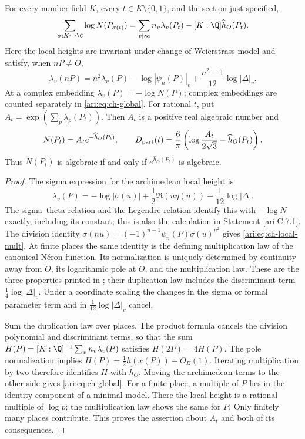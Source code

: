 \begin{proposition}\label{ari:C.6.1}
For every number field $K$, every $t\in K\setminus\{0,1\}$,
and the section just specified,
\begin{equation}\label{ari:eq:ch-global}
 \sum_{\sigma:K\hookrightarrow\C}\log N(P_{\sigma(t)})
 =\sum_{v\nmid\infty}n_v\lambda_v(P_t)
          -[K:\Q]\widehat h_O(P_t).
\end{equation}
Here the local heights are invariant under change of Weierstrass
model and satisfy, when $nP\ne O$,
\begin{equation}\label{ari:eq:ch-local-mult}
 \lambda_v(nP)=n^2\lambda_v(P)-\log|\psi_n(P)|_v
                   +\frac{n^2-1}{12}\log|\Delta|_v.
\end{equation}
At a complex embedding $\lambda_v(P)=-\log N(P)$; complex
embeddings are counted separately in \eqref{ari:eq:ch-global}.
For rational $t$, put $A_t=\exp(\sum_p\lambda_p(P_t))$.
Then $A_t$ is a positive real algebraic number and
\[
 N(P_t)=A_t e^{-\widehat h_O(P_t)},\qquad
 D_{\rm part}(t)=\frac6\pi
       \left(\log\frac{A_t}{2\sqrt3}-\widehat h_O(P_t)\right).
\]
Thus $N(P_t)$ is algebraic if and only if
$e^{\widehat h_O(P_t)}$ is algebraic.
\end{proposition}

\begin{proof}
The sigma expression for the archimedean local height is
\[
 \lambda_v(P)=-\log|\sigma(u)|
       +\frac12\Re(u\eta(u))-\frac1{12}\log|\Delta|.
\]
The sigma--theta relation and the Legendre relation identify this
with $-\log N$ exactly, including its constant; this is also the
calculation in Statement \ref{ari:C.7.1}. The division identity
$\sigma(nu)=(-1)^{n-1}\psi_n(P)\sigma(u)^{n^2}$ gives
\eqref{ari:eq:ch-local-mult}. At finite places the same identity is
the defining multiplication law of the canonical N\'eron function.
Its normalization is uniquely determined by continuity away from
$O$, its logarithmic pole at $O$, and the multiplication law.
These are the three properties printed in
\citet[Section 2.1]{demarco2017}; their duplication law includes
the discriminant term $\frac14\log|\Delta|_v$.
Under a coordinate scaling the changes in the sigma or formal
parameter term and in $\frac1{12}\log|\Delta|_v$ cancel.

Sum the duplication law over places. The product formula cancels
the division polynomial and discriminant terms, so that the sum
$H(P)=[K:\Q]^{-1}\sum_vn_v\lambda_v(P)$ satisfies
$H(2P)=4H(P)$. The pole normalization implies
$H(P)=\frac12h(x(P))+O_E(1)$. Iterating multiplication by two
therefore identifies $H$ with $\widehat h_O$. Moving the
archimedean terms to the other side gives \eqref{ari:eq:ch-global}.
For a finite place, a multiple of $P$ lies in the identity component
of a minimal model. There the local height is a rational multiple
of $\log p$; the multiplication law shows the same for $P$.
Only finitely many places contribute. This proves the assertion
about $A_t$ and both of its consequences.
\end{proof}

